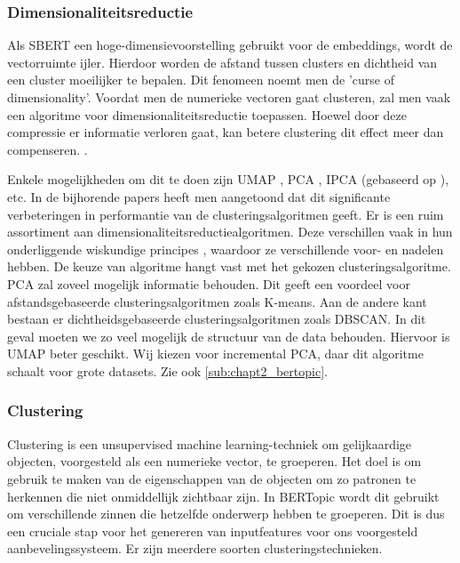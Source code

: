 \subsubsection{Dimensionaliteitsreductie}
\label{sub:chapt2_bertopic_dim_reduction}
Als SBERT een hoge-dimensievoorstelling gebruikt voor de embeddings, wordt de vectorruimte ijler. Hierdoor worden de afstand tussen clusters en dichtheid van een cluster moeilijker te bepalen.  Dit fenomeen noemt men de 'curse of dimensionality'. \cite{curse_of_dim, high_dim_problem} Voordat men de numerieke vectoren gaat clusteren, zal men vaak een algoritme voor dimensionaliteitsreductie toepassen. Hoewel door deze compressie er informatie verloren gaat, kan betere clustering dit effect meer dan compenseren. \cite{dim_reduction_summary}.

Enkele mogelijkheden om dit te doen zijn UMAP \cite{paper_umap}, PCA \cite{paper_pca}, IPCA (gebaseerd op \cite{incremental_pca}), etc.
In de bijhorende papers heeft men aangetoond dat dit significante verbeteringen in performantie van de clusteringsalgoritmen geeft. 
Er is een ruim assortiment \cite{dim_reduction_options} aan dimensionaliteitsreductiealgoritmen. Deze verschillen vaak in hun onderliggende wiskundige principes \cite{dim_reduction_summary}, waardoor ze verschillende voor- en nadelen hebben. De keuze van algoritme hangt vast met het gekozen clusteringsalgoritme. PCA zal zoveel mogelijk informatie behouden. Dit geeft een voordeel voor afstandsgebaseerde clusteringsalgoritmen zoals K-means. Aan de andere kant bestaan er dichtheidsgebaseerde clusteringsalgoritmen zoals DBSCAN. In dit geval moeten we zo veel mogelijk de structuur van de data behouden. Hiervoor is UMAP beter geschikt. Wij kiezen voor incremental PCA, daar dit algoritme schaalt voor grote datasets. Zie ook \autoref{sub:chapt2_bertopic}.

\subsubsection{Clustering}
\label{sub:chapt2_bertopic_clustering}
Clustering is een unsupervised machine learning-techniek om gelijkaardige objecten, voorgesteld als een numerieke vector, te groeperen. Het doel is om gebruik te maken van de eigenschappen van de objecten om zo patronen te herkennen die niet onmiddellijk zichtbaar zijn. In BERTopic wordt dit gebruikt om verschillende zinnen die hetzelfde onderwerp hebben te groeperen. Dit is dus een cruciale stap voor het genereren van inputfeatures voor ons voorgesteld aanbevelingssysteem. Er zijn meerdere soorten clusteringstechnieken. \cite{clustering_types_of}

